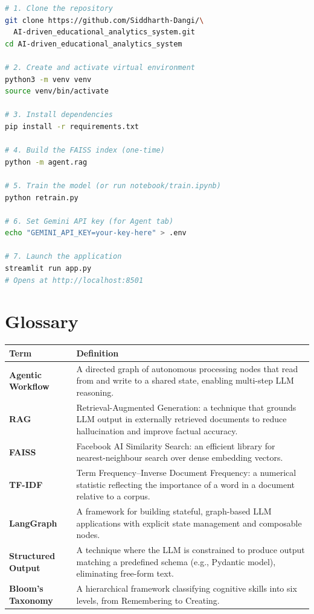 \documentclass[12pt, a4paper, twoside]{article}
\begin{document}
\begin{lstlisting}[language=bash,
  caption={Full reproduction steps.}]
# 1. Clone the repository
git clone https://github.com/Siddharth-Dangi/\
  AI-driven_educational_analytics_system.git
cd AI-driven_educational_analytics_system

# 2. Create and activate virtual environment
python3 -m venv venv
source venv/bin/activate

# 3. Install dependencies
pip install -r requirements.txt

# 4. Build the FAISS index (one-time)
python -m agent.rag

# 5. Train the model (or run notebook/train.ipynb)
python retrain.py

# 6. Set Gemini API key (for Agent tab)
echo "GEMINI_API_KEY=your-key-here" > .env

# 7. Launch the application
streamlit run app.py
# Opens at http://localhost:8501
\end{lstlisting}

\section{Glossary}\label{app:glossary}

\begin{center}
\renewcommand{\arraystretch}{1.25}
\begin{tabularx}{\textwidth}{l X}
    \toprule
    \textbf{Term} & \textbf{Definition} \\
    \midrule
    \textbf{Agentic Workflow} & A directed graph of autonomous
    processing nodes that read from and write to a shared state,
    enabling multi-step LLM reasoning. \\
    \textbf{RAG} & Retrieval-Augmented Generation: a technique that
    grounds LLM output in externally retrieved documents to reduce
    hallucination and improve factual accuracy. \\
    \textbf{FAISS} & Facebook AI Similarity Search: an efficient
    library for nearest-neighbour search over dense embedding
    vectors. \\
    \textbf{TF-IDF} & Term Frequency--Inverse Document Frequency:
    a numerical statistic reflecting the importance of a word in a
    document relative to a corpus. \\
    \textbf{LangGraph} & A framework for building stateful,
    graph-based LLM applications with explicit state management and
    composable nodes. \\
    \textbf{Structured Output} & A technique where the LLM is
    constrained to produce output matching a predefined schema
    (e.g., Pydantic model), eliminating free-form text. \\
    \textbf{Bloom's Taxonomy} & A hierarchical framework classifying
    cognitive skills into six levels, from Remembering to Creating. \\
    \bottomrule
\end{tabularx}
\end{center}
\end{document}
